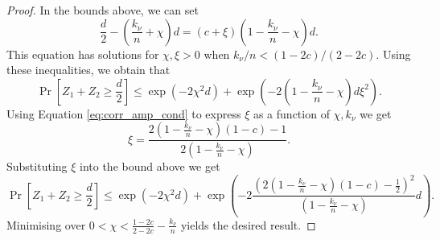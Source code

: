 \documentclass[12pt]{iopart}
\renewcommand{\1}{\mathds{1}}
\begin{document}
\begin{proof}
In the bounds above, we can set
\begin{equation}
\label{eq:corr_amp_cond}
\frac{d}{2} - \left(\frac{k_\nu}{n} + \chi\right) d = (c + \xi)\left(1 - \frac{k_\nu}{n} - \chi\right) d.
\end{equation}
This equation has solutions for $\chi, \xi > 0$ when $k_\nu/n < (1 - 2c)/(2 - 2c)$. 
Using these inequalities, we obtain that
\begin{equation}
\Pr[Z_1 + Z_2 \geq \frac{d}{2}] \leq \exp(-2\chi^2 d) + \exp(- 2\left(1- \frac{k_\nu}{n} - \chi\right)d \xi^2).
\end{equation}
Using Equation \ref{eq:corr_amp_cond} to express $\xi$ as a function of $\chi, k_\nu$ we get
\begin{equation}
\xi = \frac{2\left(1 - \frac{k_\nu}{n} - \chi\right)(1 - c) - 1}{2\left(1 - \frac{k_\nu}{n} - \chi\right)}.
\end{equation}
Substituting $\xi$ into the bound above we get
\begin{equation}
\Pr[Z_1 + Z_2 \geq \frac{d}{2}] \leq \exp(-2\chi^2 d) + \exp(- 2 \frac{\left(2\left(1 - \frac{k_\nu}{n} - \chi\right)(1 - c) - \frac{1}{2}\right)^2}{\left(1 - \frac{k_\nu}{n} - \chi\right)}d).
\end{equation}
Minimising over $0 < \chi < \frac{1 - 2c}{2 - 2c} - \frac{k_\nu}{n}$ yields the desired result.
\end{proof}
\end{document}
